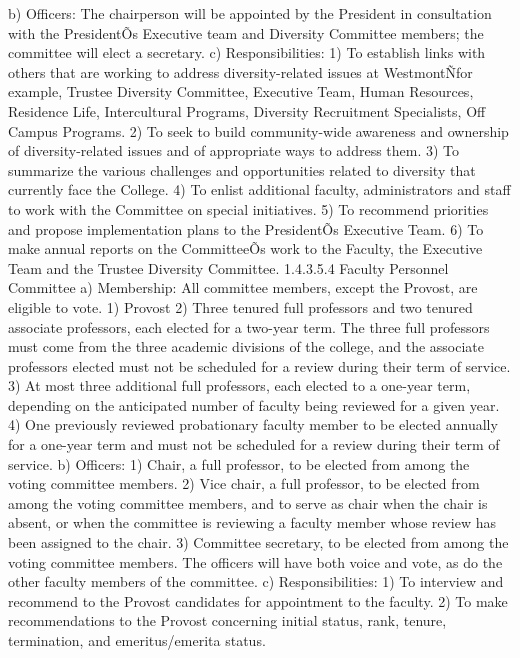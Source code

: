 \documentclass[letterpaper, 11pt]{article}
\begin{document}
				b) Officers:
				The chairperson will be appointed by the President in consultation with the PresidentÕs Executive team and Diversity Committee members; the committee will elect a secretary.
				c) Responsibilities:
				1) To establish links with others that are working to address diversity-related issues at WestmontÑfor example, Trustee Diversity Committee, Executive Team, Human Resources, Residence Life, Intercultural Programs, Diversity Recruitment Specialists, Off Campus Programs.
				2) To seek to build community-wide awareness and ownership of diversity-related issues and of appropriate ways to address them.
				3) To summarize the various challenges and opportunities related to diversity that currently face the College.
				4) To enlist additional faculty, administrators and staff to work with the Committee on special initiatives.
				5) To recommend priorities and propose implementation plans to the PresidentÕs Executive Team.
				6) To make annual reports on the CommitteeÕs work to the Faculty, the Executive Team and the Trustee Diversity Committee.
				1.4.3.5.4 Faculty Personnel Committee
				a) Membership:
				All committee members, except the Provost, are eligible to vote.
				1) Provost
				2) Three tenured full professors and two tenured associate professors, each elected for a two-year term.  The three full professors must come from the three academic divisions of the college, and the associate professors elected must not be scheduled for a review during their term of service.
				3) At most three additional full professors, each elected to a one-year term, depending on the anticipated number of faculty being reviewed for a given year.
				4) One previously reviewed probationary faculty member to be elected annually for a one-year term and must not be scheduled for a review during their term of service.
				b) Officers:
				1) Chair, a full professor, to be elected from among the voting committee members.
				2) Vice chair, a full professor, to be elected from among the voting committee members, and to serve as chair when the chair is absent, or when the committee is reviewing a faculty member whose review has been assigned to the chair.
				3) Committee secretary, to be elected from among the voting committee members.  The officers will have both voice and vote, as do the other faculty members of the committee.
				c) Responsibilities:
				1) To interview and recommend to the Provost candidates for appointment to the faculty.
				2) To make recommendations to the Provost concerning initial status, rank, tenure, termination, and emeritus/emerita status.
\end{document}
